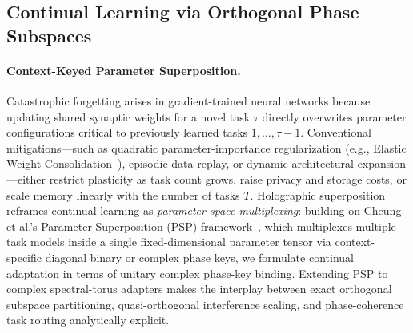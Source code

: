 \subsection{Continual Learning via Orthogonal Phase Subspaces}\label{sec:potentials:continual}

\paragraph{Context-Keyed Parameter Superposition.}
Catastrophic forgetting arises in gradient-trained neural networks because updating shared synaptic weights for a novel task $\tau$ directly overwrites parameter configurations critical to previously learned tasks $1, \dots, \tau - 1$.
Conventional mitigations---such as quadratic parameter-importance regularization (e.g., Elastic Weight Consolidation~\cite{KIRKPATRICK_2017_EWC}), episodic data replay, or dynamic architectural expansion---either restrict plasticity as task count grows, raise privacy and storage costs, or scale memory linearly with the number of tasks $T$.
Holographic superposition reframes continual learning as \emph{parameter-space multiplexing}: building on Cheung et al.'s Parameter Superposition (PSP) framework~\cite{HOLOGRAPHIC_CONTINUAL_LEARNING}, which multiplexes multiple task models inside a single fixed-dimensional parameter tensor via context-specific diagonal binary or complex phase keys, we formulate continual adaptation in terms of unitary complex phase-key binding.
Extending PSP to complex spectral-torus adapters makes the interplay between exact orthogonal subspace partitioning, quasi-orthogonal interference scaling, and phase-coherence task routing analytically explicit.

